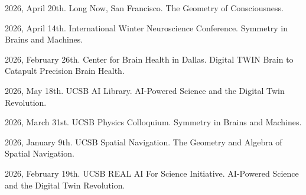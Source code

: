 
2026, April 20th. Long Now, San Francisco. The Geometry of Consciousness.

2026, April 14th. International Winter Neuroscience Conference. Symmetry in Brains and Machines.

2026, February 26th. Center for Brain Health in Dallas. Digital TWIN Brain to Catapult Precision Brain Health.

2026, May 18th. UCSB AI Library. AI-Powered Science and the Digital Twin Revolution.

2026, March 31st. UCSB Physics Colloquium. Symmetry in Brains and Machines.

2026, January 9th. UCSB Spatial Navigation. The Geometry and Algebra of Spatial Navigation.

2026, February 19th. UCSB REAL AI For Science Initiative. AI-Powered Science and the Digital Twin Revolution.



